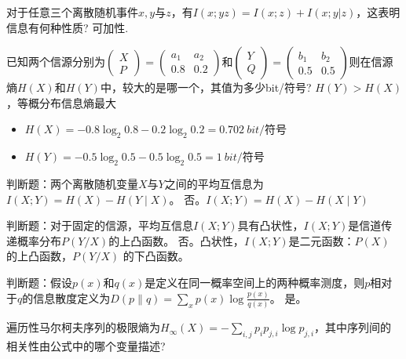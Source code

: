 \begin{problem}
	对于任意三个离散随机事件$x,y$与$z$，有$I(x;yz)=I(x;z)+I(x;y|z)$，这表明信息有何种性质?
	\solution 可加性.
\end{problem}

\begin{problem}
	已知两个信源分别为$\begin{pmatrix}X\\P\end{pmatrix}=\begin{pmatrix}a_1&a_2\\0.8&0.2\end{pmatrix}$和$\begin{pmatrix}Y\\Q\end{pmatrix}=\begin{pmatrix}b_1&b_2\\0.5&0.5\end{pmatrix}$则在信源熵$H(X)$和$H(Y)$中，较大的是哪一个，其值为多少bit/符号?
	\solution $H(Y) > H(X)$，等概分布信息熵最大\begin{itemize}
		\item $H(X) = -0.8\log_2 0.8 - 0.2\log_2 0.2 = \SI{0.702}{bit/\text{符号}}$
		\item $H(Y) = -0.5\log_2 0.5 - 0.5\log_2 0.5 = \SI{1}{bit/\text{符号}}$
	\end{itemize}
\end{problem}

\begin{problem}
	判断题：两个离散随机变量$X$与$Y$之间的平均互信息为$I(X;Y)=H(X)-H(Y\mid X)$。
	\solution 否。$I(X;Y)=H(X)-H(X\mid Y)$
\end{problem}

\begin{problem}
	判断题：对于固定的信源，平均互信息$I(X;Y)$具有凸状性，$I(X;Y)$是信道传递概率分布$P(Y/X)$的上凸函数。
	\solution 否。凸状性，$I(X; Y)$是二元函数：$P(X)$ 的上凸函数，$P(Y/X)$ 的下凸函数。
\end{problem}

\begin{problem}
	判断题：假设$p(x)$和$q(x)$是定义在同一概率空间上的两种概率测度，则$p$相对于$q$的信息散度定义为$D(p\|q)=\sum_xp(x)\log\frac{p(x)}{q(x)}$。
	\solution 是。
\end{problem}

\begin{problem}[\todo]
	遍历性马尔柯夫序列的极限熵为$H_\infty(X)=-\sum_{i,j}p_ip_{j,i}\log p_{j,i}$，其中序列间的相关性由公式中的哪个变量描述?
	\solution 
\end{problem}

